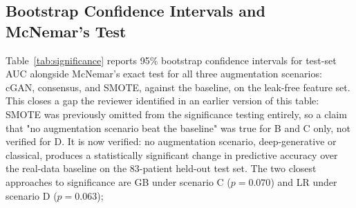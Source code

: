 \begin{table}[!tb]
  \centering
  \caption{5-Fold Cross-Validation AUC ()}
  \label{tab:cv}
\end{table}

\subsection{Bootstrap Confidence Intervals and McNemar's Test}

Table~\ref{tab:significance} reports 95\% bootstrap confidence intervals for test-set AUC alongside McNemar's exact test for all three augmentation scenarios: cGAN, consensus, and SMOTE, against the baseline, on the leak-free feature set. This closes a gap the reviewer identified in an earlier version of this table: SMOTE was previously omitted from the significance testing entirely, so a claim that "no augmentation scenario beat the baseline" was true for B and C only, not verified for D. It is now verified:  no augmentation scenario, deep-generative or classical, produces a statistically significant change in predictive accuracy over the real-data baseline on the 83-patient held-out test set. The two closest approaches to significance are GB under scenario C ($p = 0.070$) and LR under scenario D ($p = 0.063$); 

